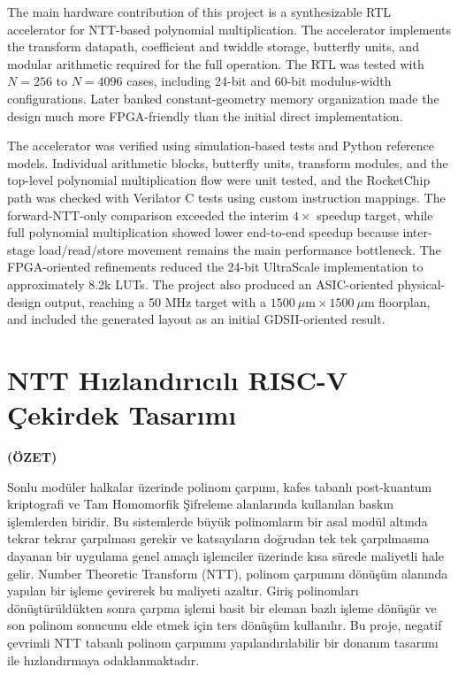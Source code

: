 \documentclass[a4paper, 12pt, titlepage]{article}
\newcommand{\theturkishtitle}{NTT Hızlandırıcılı RISC-V Çekirdek Tasarımı}
\begin{document}
The main hardware contribution of this project is a synthesizable RTL accelerator for NTT-based polynomial multiplication. The accelerator implements the transform datapath, coefficient and twiddle storage, butterfly units, and modular arithmetic required for the full operation. The RTL was tested with \(N=256\) to \(N=4096\) cases, including 24-bit and 60-bit modulus-width configurations. Later banked constant-geometry memory organization made the design much more FPGA-friendly than the initial direct implementation.

The accelerator was verified using simulation-based tests and Python reference models. Individual arithmetic blocks, butterfly units, transform modules, and the top-level polynomial multiplication flow were unit tested, and the RocketChip path was checked with Verilator C tests using custom instruction mappings. The forward-NTT-only comparison exceeded the interim \(4\times\) speedup target, while full polynomial multiplication showed lower end-to-end speedup because inter-stage load/read/store movement remains the main performance bottleneck. The FPGA-oriented refinements reduced the 24-bit UltraScale implementation to approximately 8.2k LUTs. The project also produced an ASIC-oriented physical-design output, reaching a 50 MHz target with a \(1500~\mu\mathrm{m} \times 1500~\mu\mathrm{m}\) floorplan, and included the generated layout as an initial GDSII-oriented result.

\newpage
\section*{\centering\theturkishtitle}
\centerline{\fontsize{16pt}{21.6pt}\sffamily\bfseries (ÖZET)}


Sonlu modüler halkalar üzerinde polinom çarpımı, kafes tabanlı post-kuantum kriptografi ve Tam Homomorfik Şifreleme alanlarında kullanılan baskın işlemlerden biridir. Bu sistemlerde büyük polinomların bir asal modül altında tekrar tekrar çarpılması gerekir ve katsayıların doğrudan tek tek çarpılmasına dayanan bir uygulama genel amaçlı işlemciler üzerinde kısa sürede maliyetli hale gelir. Number Theoretic Transform (NTT), polinom çarpımını dönüşüm alanında yapılan bir işleme çevirerek bu maliyeti azaltır. Giriş polinomları dönüştürüldükten sonra çarpma işlemi basit bir eleman bazlı işleme dönüşür ve son polinom sonucunu elde etmek için ters dönüşüm kullanılır. Bu proje, negatif çevrimli NTT tabanlı polinom çarpımını yapılandırılabilir bir donanım tasarımı ile hızlandırmaya odaklanmaktadır.
\end{document}
